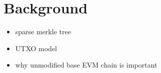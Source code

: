 \section{Background}

\begin{itemize}
    \item sparse merkle tree
    \item UTXO model
    \item why unmodified base EVM chain is important
\end{itemize}